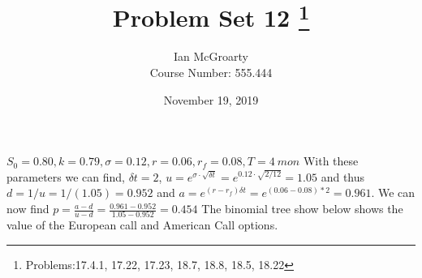 \documentclass[12pt]{article}
\title{Problem Set 12 \thanks{Problems:17.4.1, 17.22, 17.23, 18.7, 18.8, 18.5, 18.22}}
\author{Ian McGroarty \\
	Course Number: 555.444 \\
}
\date{November 19, 2019}
\newenvironment{problem}[3][Problem]{\begin{trivlist}
\item[\hskip \labelsep {\bfseries #1}\hskip \labelsep {\bfseries #2.}]}{\end{trivlist}}
\begin{document}
\maketitle

\newpage
\begin{problem}{15.4}. $S_0 = 0.80, k= 0.79, \sigma = 0.12, r= 0.06, r_f = 0.08, T=4 \ mon$ With these parameters we can find, $\delta t = 2$, $u=e^{\sigma \cdot \sqrt{\delta t}} = e^{0.12 \cdot \sqrt{2/12}} = 1.05$ and thus $d = 1/u = 1/(1.05) = 0.952$ and $a=e^{(r-r_f) \delta t} = e^{(0.06-0.08)*2}=0.961.$ We can now find $p=\frac{a-d}{u-d} = \frac{0.961 - 0.952}{1.05-0.952} = 0.454$ The binomial tree show below shows the value of the European call and American Call options. 	


\end{problem}
\end{document}

